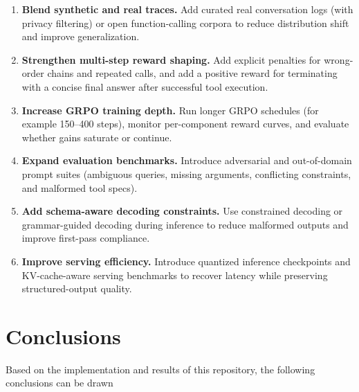 \documentclass[12pt, a4paper]{article}
\begin{document}
\begin{enumerate}[leftmargin=1.5em, itemsep=6pt]
  \item \textbf{Blend synthetic and real traces.}
    Add curated real conversation logs (with privacy filtering) or open
    function-calling corpora to reduce distribution shift and improve
    generalization.

  \item \textbf{Strengthen multi-step reward shaping.}
    Add explicit penalties for wrong-order chains and repeated calls, and add a
    positive reward for terminating with a concise final answer after successful
    tool execution.

  \item \textbf{Increase GRPO training depth.}
    Run longer GRPO schedules (for example 150--400 steps), monitor per-component
    reward curves, and evaluate whether gains saturate or continue.

  \item \textbf{Expand evaluation benchmarks.}
    Introduce adversarial and out-of-domain prompt suites (ambiguous queries,
    missing arguments, conflicting constraints, and malformed tool specs).

  \item \textbf{Add schema-aware decoding constraints.}
    Use constrained decoding or grammar-guided decoding during inference to
    reduce malformed outputs and improve first-pass compliance.

  \item \textbf{Improve serving efficiency.}
    Introduce quantized inference checkpoints and KV-cache-aware serving
    benchmarks to recover latency while preserving structured-output quality.
\end{enumerate}

\newpage

\section{Conclusions}

Based on the implementation and results of this repository, the following
conclusions can be drawn
\end{document}
